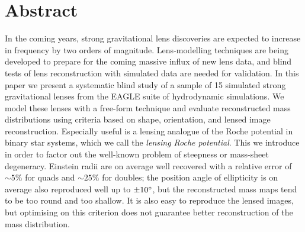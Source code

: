 
\clearpage

\section*{Abstract}
  \noindent In the coming years, strong gravitational lens discoveries
  are expected to increase in frequency by two orders of magnitude.
  Lens-modelling techniques are being developed to prepare for the
  coming massive influx of new lens data, and blind tests of lens
  reconstruction with simulated data are needed for validation.  In
  this paper we present a systematic blind study of a sample of 15
  simulated strong gravitational lenses from the EAGLE suite of
  hydrodynamic simulations.  We model these lenses with a free-form
  technique and evaluate reconstructed mass distributions using
  criteria based on shape, orientation, and lensed image
  reconstruction.  Especially useful is a lensing analogue of the
  Roche potential in binary star systems, which we call the {\em
    lensing Roche potential}.  This we introduce in order to factor
  out the well-known problem of steepness or mass-sheet degeneracy.
  Einstein radii are on average well recovered with a relative error
  of ${\sim}5\%$ for quads and ${\sim}25\%$ for doubles; the position angle of
  ellipticity is on average also reproduced well up to $\pm10^\circ$,
  but the reconstructed mass maps tend to be too round and too
  shallow.  It is also easy to reproduce the lensed images, but
  optimising on this criterion does not guarantee better
  reconstruction of the mass distribution.

\clearpage












